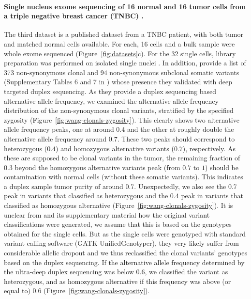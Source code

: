 \documentclass[authoryear,preprint,11pt]{scrartcl}
\begin{document}
\paragraph{Single nucleus exome sequencing of 16 normal and 16 tumor cells from a triple negative breast cancer (TNBC) \citep{wang_clonal_2014}.}
The third dataset is a published dataset from a TNBC patient, with both tumor and matched normal cells available.
For each, 16 cells and a bulk sample were whole exome sequenced (Figure~\ref{fig:datasets}c).
For the 32 single cells, library preparation was performed on isolated single nuclei \citep{wang_clonal_2014}.
In addition, \cite{wang_clonal_2014} provide a list of 373 non-synonymous clonal and 94 non-synonymous subclonal somatic variants (Supplementary Tables 6 and 7 in \cite{wang_clonal_2014}) whose presence they validated with deep targeted duplex sequencing.
As they provide a duplex sequencing based alternative allele frequency, we examined the alternative allele frequency distribution of the non-synonymous clonal variants, stratified by the specified zygosity (Figure~\ref{fig:wang-clonals-zygosity}).
This clearly shows two alternative allele frequency peaks, one at around $0.4$ and the other at roughly double the alternative allele frequency around $0.7$.
These two peaks should correspond to heterozygous ($0.4$) and homozygous alternative variants ($0.7$), respectively.
As these are supposed to be clonal variants in the tumor, the remaining fraction of $0.3$ beyond the homozygous alternative variants peak (from $0.7$ to $1$) should be contamination with normal cells (without these somatic variants).
This indicates a duplex sample tumor purity of around $0.7$.
Unexpectedly, we also see the $0.7$ peak in variants that \cite{wang_clonal_2014} classified as heterozygous and the $0.4$ peak in variants that \cite{wang_clonal_2014} classified as homozygous alternative (Figure~\ref{fig:wang-clonals-zygosity}).
It is unclear from \cite{wang_clonal_2014} and its supplementary material how the original variant classifications were generated, we assume that this is based on the genotypes obtained for the single cells.
But as the single cells were genotyped with standard variant calling software (GATK UnifiedGenotyper), they very likely suffer from considerable allelic dropout and we thus reclassified the clonal variants' genotypes based on the duplex sequencing.
If the alternative allele frequency determined by the ultra-deep duplex sequencing was below $0.6$, we classified the variant as heterozygous, and as homozygous alternative if this frequency was above (or equal to) $0.6$ (Figure~\ref{fig:wang-clonals-zygosity}).
\end{document}
